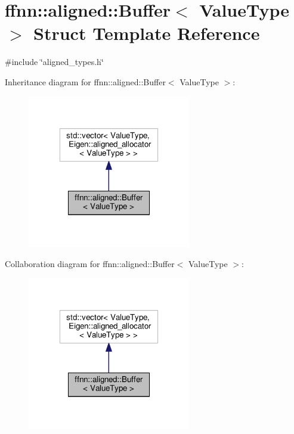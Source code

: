 \hypertarget{structffnn_1_1aligned_1_1_buffer}{\section{ffnn\-:\-:aligned\-:\-:Buffer$<$ Value\-Type $>$ Struct Template Reference}
\label{structffnn_1_1aligned_1_1_buffer}
}


{\ttfamily \#include \char`\"{}aligned\-\_\-types.\-h\char`\"{}}



Inheritance diagram for ffnn\-:\-:aligned\-:\-:Buffer$<$ Value\-Type $>$\-:
\nopagebreak
\begin{figure}[H]
\begin{center}
\leavevmode
\includegraphics[width=202pt]{structffnn_1_1aligned_1_1_buffer__inherit__graph}
\end{center}
\end{figure}


Collaboration diagram for ffnn\-:\-:aligned\-:\-:Buffer$<$ Value\-Type $>$\-:
\nopagebreak
\begin{figure}[H]
\begin{center}
\leavevmode
\includegraphics[width=202pt]{structffnn_1_1aligned_1_1_buffer__coll__graph}
\end{center}
\end{figure}

